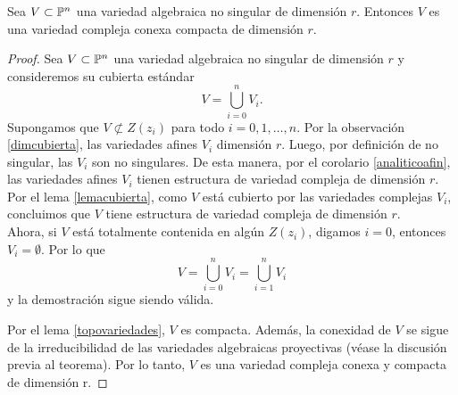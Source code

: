\begin{theorem}\label{varalg}
	Sea $V\subset\mathbb{P}^n$ una variedad algebraica no singular de dimensión $r$. Entonces $V$ es una variedad compleja conexa compacta de dimensión $r$.    	
\end{theorem}
\begin{proof}
	Sea $V\subset\mathbb{P}^n$ una variedad algebraica no singular de dimensión $r$ y consideremos su cubierta estándar 
	\begin{equation*}
		V=\bigcup_{i=0}^n V_i.
	\end{equation*}
	Supongamos que $V\not\subset Z(z_i)$ para todo $i=0,1,\dots,n$. Por la observación \ref{dimcubierta}, las variedades afines $V_i$ dimensión $r$. Luego, por definición de no singular, las $V_i$ son no singulares. De esta manera, por el corolario \ref{analiticoafin}, las variedades afines $V_i$ tienen estructura de variedad compleja de dimensión $r$.\\
	Por el lema \ref{lemacubierta}, como $V$ está cubierto por las variedades complejas $V_i$, concluimos que $V$ tiene estructura de variedad compleja de dimensión $r$.\\
	Ahora, si $V$ está totalmente contenida en algún $Z(z_i)$, digamos $i=0$, entonces $V_i=\emptyset$. Por lo que
	\begin{equation*}
		V=\bigcup_{i=0}^n V_i=\bigcup_{i=1}^n V_i
	\end{equation*}
	y la demostración sigue siendo válida.
	
	Por el lema \ref{topovariedades}, $V$ es compacta. Además, la conexidad de $V$ se sigue de la irreducibilidad de las variedades algebraicas proyectivas (véase la discusión previa al teorema). Por lo tanto, $V$ es una variedad compleja conexa y compacta de dimensión r.
\end{proof}